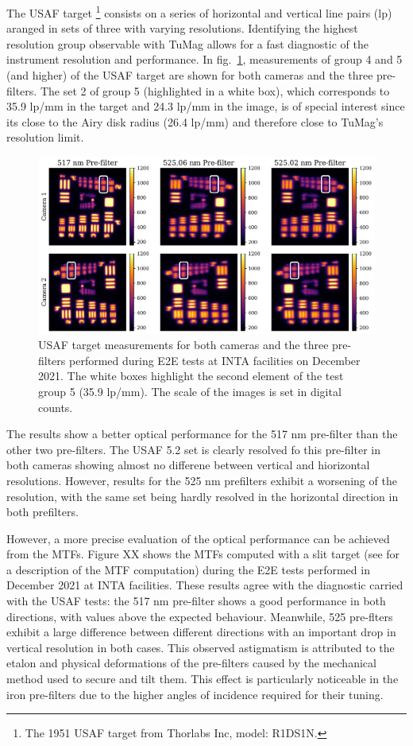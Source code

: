 The USAF target \footnote{The 1951 USAF target from Thorlabs Inc, model: R1DS1N.} consists on a series of horizontal and vertical line pairs (lp) aranged in sets of three with varying resolutions. Identifying the highest resolution group observable with TuMag allows for a fast diagnostic of the instrument resolution and performance. In fig.~\ref{tumag : USAF}, measurements of group 4 and 5 (and higher) of the USAF target are shown for both cameras and the three pre-filters. The set 2 of group 5 (highlighted in a white box), which corresponds to 35.9 lp/mm in the target and 24.3 lp/mm in the image, is of special interest since its close to the Airy disk radius (26.4 lp/mm) and therefore close to TuMag's resolution limit. 

\begin{figure}
    \includegraphics[width=\textwidth]{figures/TuMag/USAF_E2E.pdf}
    \caption{
      USAF target measurements for both cameras and the three pre-filters performed during E2E tests at INTA facilities on December 2021. The white boxes highlight the second element of the test group 5 (35.9 lp/mm). The scale of the images is set in digital counts.}
      \label{tumag : USAF}
\end{figure}

The results show a better optical performance for the 517 nm pre-filter than the other two pre-filters. The USAF 5.2 set is clearly resolved fo this pre-filter in both cameras showing almost no differene between vertical and hiorizontal resolutions. However, results for the 525 nm prefilters exhibit a worsening of the resolution, with the same set being hardly resolved in the horizontal direction in both prefilters. 

However, a more precise evaluation of the optical performance can be achieved from the MTFs. Figure XX shows the MTFs computed with a slit target (see \cite{slanted-method} for a description of the MTF computation) during the E2E tests performed in December 2021 at INTA facilities. These results agree with the diagnostic carried with the USAF tests: the 517 nm pre-filter shows a good performance in both directions, with values above the expected behaviour. Meanwhile, 525 pre-flters exhibit a large difference between different directions with an important drop in vertical resolution in both cases. This observed astigmatism is attributed to the etalon and physical deformations of the pre-filters caused by the mechanical method used to secure and tilt them. This effect is particularly noticeable in the iron pre-filters due to the higher angles of incidence required for their tuning.

